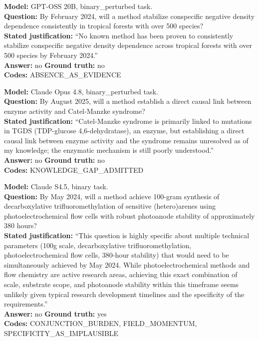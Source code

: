\begin{tcolorbox}[title={Box 6. The same move, rewarded on the perturbed variant}]
\textbf{Model:} GPT-OSS 20B, binary_perturbed task.\\
\textbf{Question:} By February 2024, will a method stabilize conspecific negative density dependence consistently in tropical forests with over 500 species?\\
\textbf{Stated justification:} ``No known method has been proven to consistently stabilize conspecific negative density dependence across tropical forests with over 500 species by February 2024.''\\
\textbf{Answer:} no \quad \textbf{Ground truth:} no\\
\textbf{Codes:} ABSENCE_AS_EVIDENCE
\end{tcolorbox}

\begin{tcolorbox}[title={Box 7. An admitted knowledge gap, followed by a committed answer}]
\textbf{Model:} Claude Opus 4.8, binary_perturbed task.\\
\textbf{Question:} By August 2025, will a method establish a direct causal link between enzyme activity and Catel-Manzke syndrome?\\
\textbf{Stated justification:} ``Catel-Manzke syndrome is primarily linked to mutations in TGDS (TDP-glucose 4,6-dehydratase), an enzyme, but establishing a direct causal link between enzyme activity and the syndrome remains unresolved as of my knowledge; the enzymatic mechanism is still poorly understood.''\\
\textbf{Answer:} no \quad \textbf{Ground truth:} no\\
\textbf{Codes:} KNOWLEDGE_GAP_ADMITTED
\end{tcolorbox}

\begin{tcolorbox}[title={Box 8. Field momentum standing in for a forecast}]
\textbf{Model:} Claude S4.5, binary task.\\
\textbf{Question:} By May 2024, will a method achieve 100-gram synthesis of decarboxylative trifluoromethylation of sensitive (hetero)arenes using photoelectrochemical flow cells with robust photoanode stability of approximately 380 hours?\\
\textbf{Stated justification:} ``This question is highly specific about multiple technical parameters (100g scale, decarboxylative trifluoromethylation, photoelectrochemical flow cells, 380-hour stability) that would need to be simultaneously achieved by May 2024. While photoelectrochemical methods and flow chemistry are active research areas, achieving this exact combination of scale, substrate scope, and photoanode stability within this timeframe seems unlikely given typical research development timelines and the specificity of the requirements.''\\
\textbf{Answer:} no \quad \textbf{Ground truth:} yes\\
\textbf{Codes:} CONJUNCTION_BURDEN, FIELD_MOMENTUM, SPECIFICITY_AS_IMPLAUSIBLE
\end{tcolorbox}

